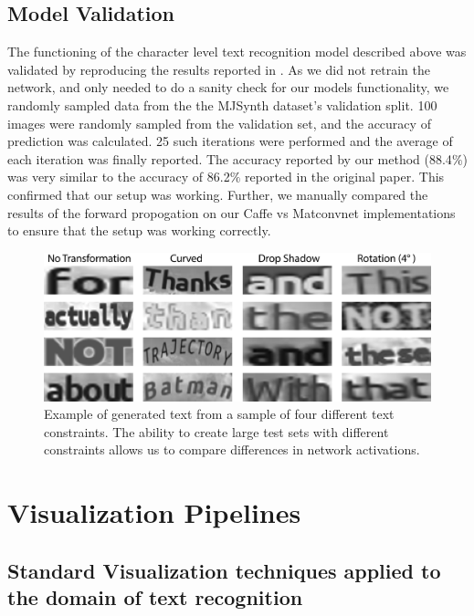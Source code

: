 \documentclass[10pt,twocolumn,letterpaper]{article}
\begin{document}
\subsection{Model Validation}
The functioning of the character level text recognition model described above was validated by reproducing the results reported in \cite{Jaderberg14c}. As we did not retrain the network, and only needed to do a sanity check for our models functionality, we randomly sampled data from the the MJSynth dataset's validation split. 100 images were randomly sampled from the validation set, and the accuracy of prediction was calculated. 25 such iterations were performed and the average of each iteration was finally reported. The accuracy reported by our method (88.4$\%$) was very similar to the accuracy of 86.2$\%$ reported in the original paper. This confirmed that our setup was working. Further, we manually compared the results of the forward propogation on our Caffe vs Matconvnet implementations to ensure that the setup was working correctly.

\begin{figure}
\includegraphics[width=\columnwidth]{Figures/synthtext_outputs/synthext_outputs.png}
\caption{Example of generated text from a sample of four different text constraints. The ability to create large test sets with different constraints allows us to compare differences in network activations.}
\label{fig:genText}
\end{figure}

\section{Visualization Pipelines}

\subsection{Standard Visualization techniques applied to the domain of text recognition}
\end{document}
